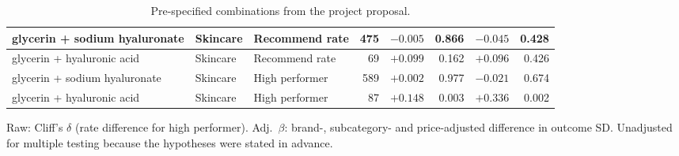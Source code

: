\begin{table}[htbp]
\begin{tabular}{|l|l|l|r|r|r|r|r|}
\hline
glycerin + sodium hyaluronate & Skincare & Recommend rate & 475 & $-0.005$ & 0.866 & $-0.045$ & 0.428 \\
\hline
glycerin + hyaluronic acid & Skincare & Recommend rate & 69 & $+0.099$ & 0.162 & $+0.096$ & 0.426 \\
\hline
glycerin + sodium hyaluronate & Skincare & High performer & 589 & $+0.002$ & 0.977 & $-0.021$ & 0.674 \\
\hline
glycerin + hyaluronic acid & Skincare & High performer & 87 & $+0.148$ & 0.003 & $+0.336$ & 0.002 \\
\hline
\end{tabular}
\par\smallskip
\parbox{0.95\linewidth}{\footnotesize Raw: Cliff's $\delta$ (rate difference for high performer). Adj.\ $\beta$: brand-, subcategory- and price-adjusted difference in outcome SD. Unadjusted for multiple testing because the hypotheses were stated in advance.}
\caption{Pre-specified combinations from the project proposal.}
\label{tab:prespecified}
\end{table}
